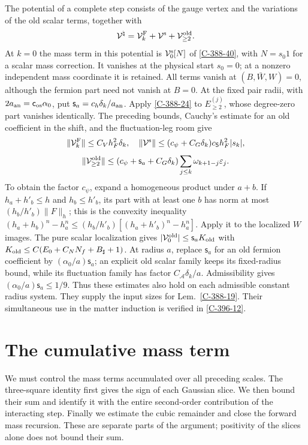 \documentclass[11pt,letterpaper,reqno]{amsart}
\theoremstyle{definition}
\theoremstyle{remark}
\begin{document}
The potential of a complete step consists of the gauge vertex
and the variations of the old scalar terms, together with
\[
 \mathcal V^{\natural}=\mathcal V_k^{\rm F}
       +\mathcal V^{\rm s}+\mathcal V^{\rm old}_{\ge2}.
\]
At $k=0$ the mass term in this potential is
$\mathcal V^{\rm s}_0[N]$ of \cref{C-388-40}, with $N=s_0 1$
for a scalar mass correction.  It vanishes at the physical start
$s_0=0$; at a nonzero independent mass coordinate it is retained.
All terms vanish at $(B,\bar W,W)=0$, although the fermion
part need not vanish at $B=0$.  At the fixed pair radii,
with $2a_{\rm an}=\mathsf c_{\rm os}\alpha_0$, put
$\mathsf s_a=c_h\delta_k/a_{\rm an}$. Apply \cref{C-388-24}
to $E_{\ge2}^{(j)}$, whose degree-zero part vanishes identically.
The preceding bounds, Cauchy's estimate for an old coefficient in
the shift, and
the fluctuation-leg room give
\[
 \|\mathcal V_k^{\rm F}\|\le C_Vh_F^2\delta_k,
 \quad \|\mathcal V^{\rm s}\|
       \le(c_\psi+C_G\delta_k)c_{\mathsf S}h_F^2|s_k|,
\]
\[
 \|\mathcal V^{\rm old}_{\ge2}\|
 \le(c_\psi+\mathsf s_a+C_G\delta_k)
                         \sum_{j\le k}\omega_{k+1-j}\varepsilon_j.
\]
To obtain the factor $c_\psi$, expand a homogeneous product
under $a+b$.  If $h_a+h'_b\le h$ and $h_b\le h'_b$, its part
with at least one $b$ has norm at most $(h_b/h'_b)\|F\|_h$;
this is the convexity inequality
$(h_a+h_b)^n-h_a^n\le(h_b/h'_b)
[(h_a+h'_b)^n-h_a^n]$.  Apply it to the localized $W$ images.
The pure scalar localization gives
$|\mathcal V^{\rm old}_0|\le\mathsf s_aK_{\rm old}$ with
$K_{\rm old}\le C(E_0+C_NN_f+B_\sharp+1)$.
At radius $a$, replace $\mathsf s_a$ for an old fermion
coefficient by $(\alpha_0/a)\mathsf s_a$; an explicit old
scalar family keeps its fixed-radius bound, while its
fluctuation family has factor $C_{\mathcal A}\delta_k/a$.
Admissibility gives $(\alpha_0/a)\mathsf s_a\le1/9$.
Thus these estimates also hold on each admissible constant
radius system.  They supply the input sizes for
Lem.~\ref{C-388-19}. Their simultaneous use in the matter
induction is verified in \cref{C-396-12}.

\section{The cumulative mass term}

We must control the mass terms accumulated over all preceding
scales. The three-square identity first gives the sign of each
Gaussian slice. We then bound their sum and identify it with
the entire second-order contribution of the interacting step.
Finally we estimate the cubic remainder and close the forward
mass recursion. These are separate parts of the argument;
positivity of the slices alone does not bound their sum.
\end{document}
